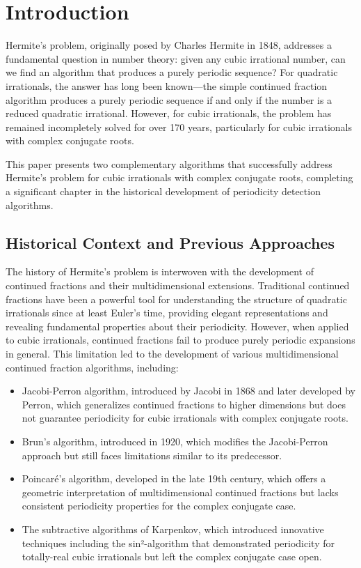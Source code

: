 \section{Introduction}\label{sec:intro}

Hermite's problem, originally posed by Charles Hermite in 1848, addresses a fundamental question in number theory: given any cubic irrational number, can we find an algorithm that produces a purely periodic sequence? For quadratic irrationals, the answer has long been known—the simple continued fraction algorithm produces a purely periodic sequence if and only if the number is a reduced quadratic irrational. However, for cubic irrationals, the problem has remained incompletely solved for over 170 years, particularly for cubic irrationals with complex conjugate roots.

This paper presents two complementary algorithms that successfully address Hermite's problem for cubic irrationals with complex conjugate roots, completing a significant chapter in the historical development of periodicity detection algorithms.

\subsection{Historical Context and Previous Approaches}

The history of Hermite's problem is interwoven with the development of continued fractions and their multidimensional extensions. Traditional continued fractions have been a powerful tool for understanding the structure of quadratic irrationals since at least Euler's time, providing elegant representations and revealing fundamental properties about their periodicity. However, when applied to cubic irrationals, continued fractions fail to produce purely periodic expansions in general. This limitation led to the development of various multidimensional continued fraction algorithms, including:

\begin{itemize}
\item Jacobi-Perron algorithm, introduced by Jacobi in 1868 and later developed by Perron, which generalizes continued fractions to higher dimensions but does not guarantee periodicity for cubic irrationals with complex conjugate roots.

\item Brun's algorithm, introduced in 1920, which modifies the Jacobi-Perron approach but still faces limitations similar to its predecessor.

\item Poincaré's algorithm, developed in the late 19th century, which offers a geometric interpretation of multidimensional continued fractions but lacks consistent periodicity properties for the complex conjugate case.

\item The subtractive algorithms of Karpenkov, which introduced innovative techniques including the sin²-algorithm that demonstrated periodicity for totally-real cubic irrationals but left the complex conjugate case open.
\end{itemize}

